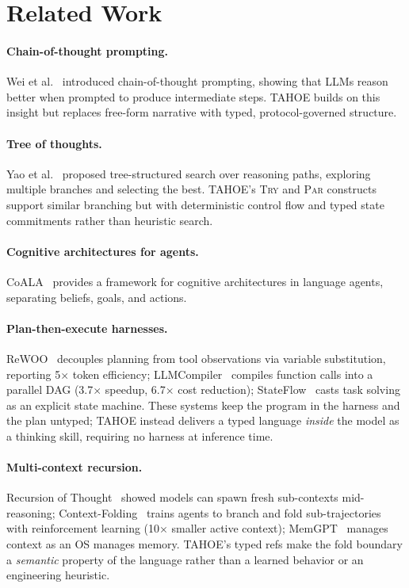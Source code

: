 \documentclass[11pt,a4paper]{article}
\begin{document}
\section{Related Work}
\label{sec:related}

\paragraph{Chain-of-thought prompting.}
Wei et al.~\cite{wei2022cot} introduced chain-of-thought prompting, showing that LLMs reason better when prompted to produce intermediate steps.
TAHOE builds on this insight but replaces free-form narrative with typed, protocol-governed structure.

\paragraph{Tree of thoughts.}
Yao et al.~\cite{yao2023tot} proposed tree-structured search over reasoning paths, exploring multiple branches and selecting the best.
TAHOE's \textsc{Try} and \textsc{Par} constructs support similar branching but with deterministic control flow and typed state commitments rather than heuristic search.

\paragraph{Cognitive architectures for agents.}
CoALA~\cite{sumers2023coala} provides a framework for cognitive architectures in language agents, separating beliefs, goals, and actions.

\paragraph{Plan-then-execute harnesses.}
ReWOO~\cite{xu2023rewoo} decouples planning from tool observations via variable substitution, reporting 5$\times$ token efficiency; LLMCompiler~\cite{kim2023llmcompiler} compiles function calls into a parallel DAG (3.7$\times$ speedup, 6.7$\times$ cost reduction); StateFlow~\cite{wu2024stateflow} casts task solving as an explicit state machine. These systems keep the program in the harness and the plan untyped; TAHOE instead delivers a typed language \emph{inside} the model as a thinking skill, requiring no harness at inference time.

\paragraph{Multi-context recursion.}
Recursion of Thought~\cite{lee2023rot} showed models can spawn fresh sub-contexts mid-reasoning; Context-Folding~\cite{sun2025folding} trains agents to branch and fold sub-trajectories with reinforcement learning (10$\times$ smaller active context); MemGPT~\cite{wang2024memgpt} manages context as an OS manages memory. TAHOE's typed refs make the fold boundary a \emph{semantic} property of the language rather than a learned behavior or an engineering heuristic.
\end{document}
